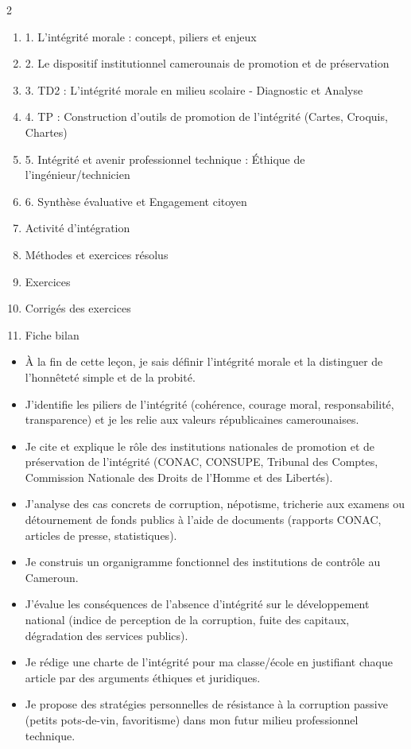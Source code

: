 \documentclass[11pt]{article}
\begin{document}
\begin{sommaire}
\begin{multicols}{2}
\begin{enumerate}
\item 1. L'intégrité morale : concept, piliers et enjeux
\item 2. Le dispositif institutionnel camerounais de promotion et de préservation
\item 3. TD2 : L'intégrité morale en milieu scolaire - Diagnostic et Analyse
\item 4. TP : Construction d'outils de promotion de l'intégrité (Cartes, Croquis, Chartes)
\item 5. Intégrité et avenir professionnel technique : Éthique de l'ingénieur/technicien
\item 6. Synthèse évaluative et Engagement citoyen
\item Activité d'intégration
\item Méthodes et exercices résolus
\item Exercices
\item Corrigés des exercices
\item Fiche bilan
\end{enumerate}
\end{multicols}
\end{sommaire}

\begin{objectifs}
\begin{itemize}
\item À la fin de cette leçon, je sais définir l'intégrité morale et la distinguer de l'honnêteté simple et de la probité.
\item J'identifie les piliers de l'intégrité (cohérence, courage moral, responsabilité, transparence) et je les relie aux valeurs républicaines camerounaises.
\item Je cite et explique le rôle des institutions nationales de promotion et de préservation de l'intégrité (CONAC, CONSUPE, Tribunal des Comptes, Commission Nationale des Droits de l'Homme et des Libertés).
\item J'analyse des cas concrets de corruption, népotisme, tricherie aux examens ou détournement de fonds publics à l'aide de documents (rapports CONAC, articles de presse, statistiques).
\item Je construis un organigramme fonctionnel des institutions de contrôle au Cameroun.
\item J'évalue les conséquences de l'absence d'intégrité sur le développement national (indice de perception de la corruption, fuite des capitaux, dégradation des services publics).
\item Je rédige une charte de l'intégrité pour ma classe/école en justifiant chaque article par des arguments éthiques et juridiques.
\item Je propose des stratégies personnelles de résistance à la corruption passive (petits pots-de-vin, favoritisme) dans mon futur milieu professionnel technique.
\end{itemize}
\end{objectifs}
\end{document}
